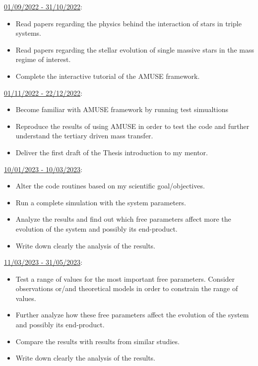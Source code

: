 \documentclass{uva-inf-article}
\numberwithin{equation}{section}
\begin{document}
\underline{01/09/2022 - 31/10/2022}:
\begin{itemize}
    \item Read papers regarding the physics behind the interaction of stars in triple systems.
    \item Read papers regarding the stellar evolution of single massive stars in the mass regime of interest. 
    \item Complete the interactive tutorial of the AMUSE framework.
\end{itemize}

\hspace*{-0.7cm}\underline{01/11/2022 - 22/12/2022}:
\begin{itemize}
    \item Become familiar with AMUSE framework by running test simualtions
    \item Reproduce the results of \citep{de2014evolution} using AMUSE in order to test the code and further understand the tertiary driven mass transfer.
    \item Deliver the first draft of the Thesis introduction to my mentor.
\end{itemize}

\hspace*{-0.7cm}\underline{10/01/2023 - 10/03/2023}:
\begin{itemize}
    \item Alter the code routines based on my scientific goal/objectives.
    \item  Run a complete simulation with the system parameters.
    \item  Analyze the results and find out which free parameters affect more the evolution of the system and possibly its end-product.
    \item Write down clearly the analysis of the results.
\end{itemize}

\hspace*{-0.7cm}\underline{11/03/2023 - 31/05/2023}:
\begin{itemize}
    \item Test a range of values for the most important free parameters. Consider observations or/and theoretical models in order to constrain the range of values.
    \item Further analyze how these free parameters affect the evolution of the system and possibly its end-product.
    \item Compare the results with results from similar studies.
    \item  Write down clearly the analysis of the results.
\end{itemize}
\end{document}

